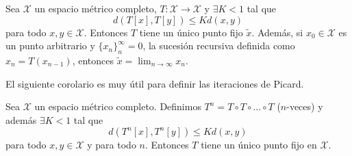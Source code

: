 \begin{thm}
Sea $\mathcal{X}$ un espacio métrico completo, $T:\mathcal{X}\to \mathcal{X}$ y  $\exists K<1$ tal que 
\begin{equation*}
    d(T[x],T[y])\leq Kd(x,y)    
\end{equation*}
para todo $x,y\in \mathcal{X}$. Entonces $T$ tiene un único punto fijo $\tilde{x}$. Además, si $x_0\in \mathcal{X}$ es un punto arbitrario y $\{x_{n}\}_n^\infty=0$, la sucesión recursiva definida como   $x_n=T(x_{n-1})$, entonces $\tilde{x}=\lim_{n\to \infty}x_n$.
\end{thm}
El siguiente corolario es muy útil para definir las iteraciones de Picard.
\begin{cor}\label{col:picard}
Sea $\mathcal{X}$ un espacio métrico completo. Definimos  $T^n=T\circ T\circ ...\circ T$ ($n$-veces) y además $\exists K<1$ tal que 
    \begin{equation*}
    d(T^n[x],T^n[y])\leq Kd(x,y)    
    \end{equation*}
para todo $x,y\in \mathcal{X}$ y para todo $n$. Entonces $T$ tiene un único punto fijo en $\mathcal{X}$.
\end{cor}
 
